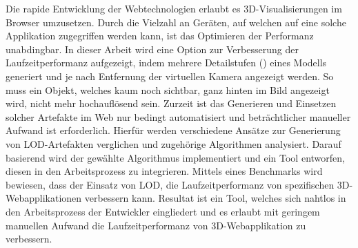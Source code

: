 Die rapide Entwicklung der Webtechnologien erlaubt es 3D-Visualisierungen im Browser umzusetzen. Durch die Vielzahl an Geräten, auf welchen auf eine solche Applikation zugegriffen werden kann, ist das Optimieren der Performanz unabdingbar. In dieser Arbeit wird eine Option zur Verbesserung der Laufzeitperformanz aufgezeigt, indem mehrere Detailstufen () eines Modells generiert und je nach Entfernung der virtuellen Kamera angezeigt werden. So muss ein Objekt, welches kaum noch sichtbar, ganz hinten im Bild angezeigt wird, nicht mehr hochauflösend sein.
Zurzeit ist das Generieren und Einsetzen solcher Artefakte im Web nur bedingt automatisiert und beträchtlicher manueller Aufwand ist erforderlich.
\bigbreak
Hierfür werden verschiedene Ansätze zur Generierung von LOD-Artefakten verglichen und zugehörige Algorithmen analysiert.
Darauf basierend wird der gewählte Algorithmus implementiert und ein Tool entworfen, diesen in den Arbeitsprozess zu integrieren.
Mittels eines Benchmarks wird bewiesen, dass der Einsatz von LOD, die Laufzeitperformanz von spezifischen 3D-Webapplikationen verbessern kann.
\bigbreak
Resultat ist ein Tool, welches sich nahtlos in den Arbeitsprozess der Entwickler eingliedert und es erlaubt mit geringem manuellen Aufwand die Laufzeitperformanz von 3D-Webapplikation zu verbessern.
